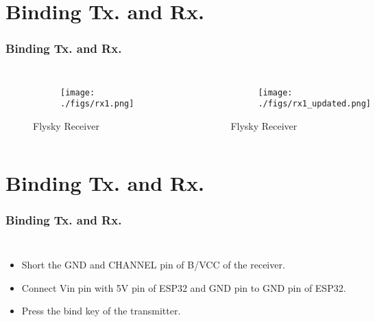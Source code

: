 \documentclass{beamer}
\begin{document}
\section{Binding Tx. and Rx.}
\begin{frame}
\frametitle{Binding Tx. and Rx.}
\begin{columns}
\begin{figure}[h!]
  \centering
  \begin{subfigure}[b]{0.75\linewidth}
    \texttt{[image: ./figs/rx1.png]}
  \end{subfigure}

  \caption{Flysky Receiver}
\end{figure}

\begin{figure}[h!]
  \centering
  \begin{subfigure}[b]{0.75\linewidth}
    \texttt{[image: ./figs/rx1\_updated.png]}
  \end{subfigure}

  \caption{Flysky Receiver}
\end{figure}
  
\end{columns}



\end{frame}

\section{Binding Tx. and Rx.}
\begin{frame}
\frametitle{Binding Tx. and Rx.}
\begin{columns}

  \begin{itemize}
  \item  Short the GND and CHANNEL pin of B/VCC of the receiver.
  \vspace{10pt}
  \item Connect Vin pin with 5V pin of ESP32 and GND pin to GND pin of ESP32.
  \vspace{10pt}
  \item Press the bind key of the transmitter.
  
  
  \end{itemize}
\end{columns}



\end{frame}
\end{document}
